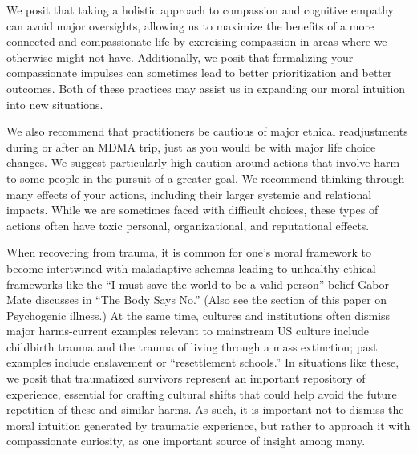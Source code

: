 \documentclass[12pt,letterpaper]{article}
\begin{document}
We posit that taking a holistic approach to compassion and cognitive empathy can avoid major oversights, allowing us to maximize the benefits of a more connected and compassionate life by exercising compassion in areas where we otherwise might not have. Additionally, we posit that formalizing your compassionate impulses can sometimes lead to better prioritization and better outcomes. Both of these practices may assist us in expanding our moral intuition into new situations.

We also recommend that practitioners be cautious of major ethical readjustments during or after an MDMA trip, just as you would be with major life choice changes. We suggest particularly high caution around actions that involve harm to some people in the pursuit of a greater goal. We recommend thinking through many effects of your actions, including their larger systemic and relational impacts. While we are sometimes faced with difficult choices, these types of actions often have toxic personal, organizational, and reputational effects.

When recovering from trauma, it is common for one's moral framework to become intertwined with maladaptive schemas-leading to unhealthy ethical frameworks like the “I must save the world to be a valid person” belief Gabor Mate discusses in “The Body Says No.” (Also see the section\todo{} of this paper on Psychogenic illness.) At the same time, cultures and institutions often dismiss major harms-current examples relevant to mainstream US culture include childbirth trauma and the trauma of living through a mass extinction; past examples include enslavement or “resettlement schools.” In situations like these, we posit that traumatized survivors represent an important repository of experience, essential for crafting cultural shifts that could help avoid the future repetition of these and similar harms. As such, it is important not to dismiss the moral intuition generated by traumatic experience, but rather to approach it with compassionate curiosity, as one important source of insight among many. 


\end{document}
